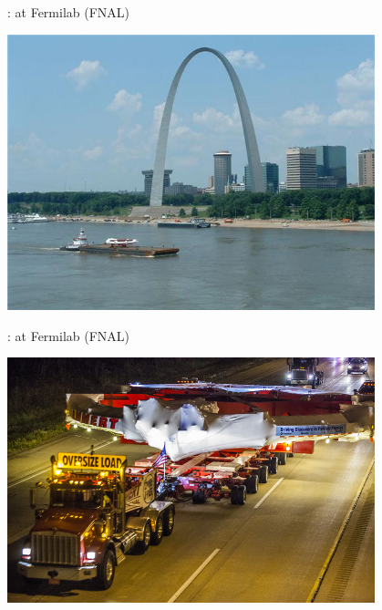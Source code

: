 \documentclass[12pt,notes]{beamer}
\begin{document}


\begin{frame}{\insertsection: at Fermilab (FNAL)}
  \begin{center}
    \includegraphics[width=0.8\textwidth]{img/FNAL-20130719-St-Louis-Arch}
    \footnotesize \cite{Transport3}
  \end{center}
\end{frame}


\begin{frame}{\insertsection: at Fermilab (FNAL)}
  \begin{center}
    \includegraphics[width=0.8\textwidth]{img/FNAL-13-0221-08D}
    \footnotesize \cite{Transport1}
  \end{center}
\end{frame}
\end{document}
